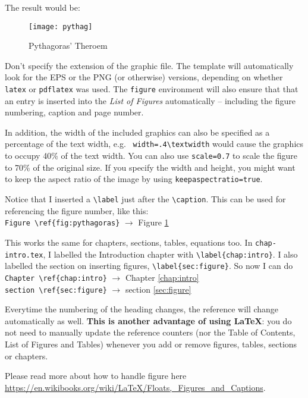 The result would be:

\begin{figure}[hbt!]\centering
\texttt{[image: pythag]}
\caption{Pythagoras' Theroem} \label{fig:pythagoras}
\end{figure}

Don't specify the extension of the graphic file.  The template will automatically look for the EPS or the PNG (or otherwise) versions, depending on whether \verb|latex| or \verb|pdflatex| was used.  The \texttt{figure} environment will also ensure that that an entry is inserted into the \emph{List of Figures} automatically -- including the figure numbering, caption and page number.

In addition, the width of the included graphics can also be specified as a percentage of the text width, e.g.~ \verb|width=.4\textwidth| would cause the graphics to occupy 40\% of the text width. You can also use \verb|scale=0.7| to scale the figure to 70\% of the original size. If you specify the width and height, you might want to keep the aspect ratio of the image by using \verb|keepaspectratio=true|. 

Notice that I inserted a \verb|\label| just after the \verb|\caption|.  This can be used for referencing the figure number, like this: \\
\verb|Figure \ref{fig:pythagoras}| $\to$ Figure \ref{fig:pythagoras}

This works the same for chapters, sections, tables, equations too.  In \verb|chap-intro.tex|, I labelled the Introduction chapter with \verb|\label{chap:intro}|.  I also labelled the section on inserting figures, \verb|\label{sec:figure}|.  So now I can do \\
\verb|Chapter \ref{chap:intro}| $\to$  Chapter \ref{chap:intro} \\
\verb|section \ref{sec:figure}| $\to$  section \ref{sec:figure}

Everytime the numbering of the heading changes, the reference will change automatically as well.  \textbf{This is another advantage of using \LaTeX{}}: you do not need to manually update the reference counters (nor the Table of Contents, List of Figures and Tables) whenever you add or remove figures, tables, sections or chapters.

\noindent Please read more about how to handle figure here \url{https://en.wikibooks.org/wiki/LaTeX/Floats,_Figures_and_Captions}.

